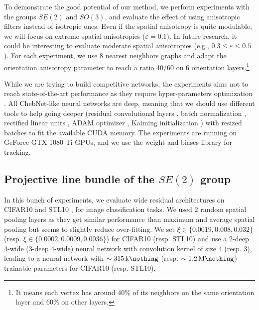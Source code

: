 \documentclass{article}
\begin{document}
To demonstrate the good potential of our method, we perform experiments with the groups $SE(2)$ and $SO(3)$, and evaluate the effect of using anisotropic filters instead of isotropic ones. Even if the spatial anisotropy is quite modulable, we will focus on extreme spatial anisotropies ($\varepsilon = 0.1$). In future research, it could be interesting to evaluate moderate spatial anisotropies (e.g., $0.3 \leq \varepsilon \leq 0.5$). For each experiment, we use 8 nearest neighbors graphs and adapt the orientation anisotropy parameter to reach a ratio 40/60 on 6 orientation layers.\footnote{It means each vertex has around 40\% of its neighbors on the same orientation layer and 60\% on other layers.} 

While we are trying to build competitive networks, the experiments aims not to reach state-of-the-art performance as they require hyper-parameters optimization \citep{yu2020hyper}. All ChebNet-like neural networks are deep, meaning that we should use different tools to help going deeper (residual convolutional layers \citep{he2016deep}, batch normalization \citep{ioffe2015batch}, rectified linear units \citep{nair2010rectified}, ADAM optimizer \citep{kingma2014adam},  Kaiming initialization \citep{he2015delving}) with resized batches to fit the available CUDA memory. The experiments are running on GeForce GTX 1080 Ti GPUs, and we use the weight and biases library \citep{wandb} for tracking. 

\subsection{Projective line bundle of the $SE(2)$ group}

In this bunch of experiments, we evaluate wide residual architectures \citep{zagoruyko2016wide} on CIFAR10 \citep{krizhevsky2009learning} and STL10 \citep{coates2011analysis}, for image classification tasks. We used 2 random spatial pooling layers as they get similar performance than maximum and average spatial pooling but seems to slightly reduce over-fitting. We set $\xi \in \{0.0019, 0.008, 0.032\}$ (resp. $\xi \in \{0.0002, 0.0009, 0.0036\}$) for CIFAR10 (resp. STL10) and use a 2-deep 4-wide (3-deep 4-wide) neural network with convolution kernel of size 4 (resp. 3), leading to a neural network with $\sim \SI{315}{\kilo\nothing}$ (resp. $\sim \SI{1.2}{\mega\nothing}$) trainable parameters for CIFAR10 (resp. STL10).
\end{document}
